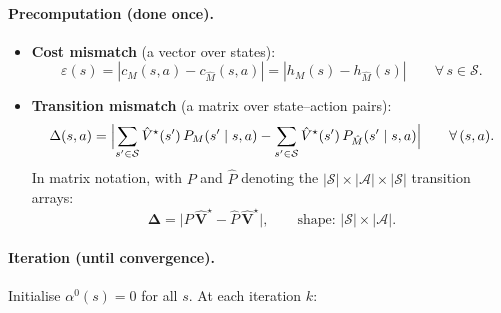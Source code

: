 \documentclass[11pt]{article}
\newcommand{\Vhatstar}{\hat V^\star}
\begin{document}
\paragraph{Precomputation (done once).}
\begin{itemize}
  \item \textbf{Cost mismatch} (a vector over states):
  \begin{equation}\label{eq:eps-q}
    \varepsilon(s) = |c_M(s,a) - c_{\hat M}(s,a)| = |h_M(s) - h_{\hat M}(s)|
    \qquad \forall\, s \in \mathcal{S}.
  \end{equation}

  \item \textbf{Transition mismatch} (a matrix over state--action pairs):
  \begin{equation}\label{eq:delta-q}
    \Delta(s, a) = \Bigl|
      \sum_{s' \in \mathcal{S}} \Vhatstar(s')\, P_M(s' \mid s, a)
      - \sum_{s' \in \mathcal{S}} \Vhatstar(s')\, P_{\hat M}(s' \mid s, a)
    \Bigr|
    \qquad \forall\, (s, a).
  \end{equation}
  In matrix notation, with $P$ and $\hat P$ denoting the $|\mathcal{S}| \times
  |\mathcal{A}| \times |\mathcal{S}|$ transition arrays:
  \[
    \boldsymbol{\Delta} = \bigl| P \,\hat{\mathbf{V}}^\star
    - \hat P \,\hat{\mathbf{V}}^\star \bigr|,
    \qquad \text{shape: } |\mathcal{S}| \times |\mathcal{A}|.
  \]
\end{itemize}

\paragraph{Iteration (until convergence).}
Initialise $\alpha^0(s) = 0$ for all $s$.  At each iteration $k$:
\end{document}
